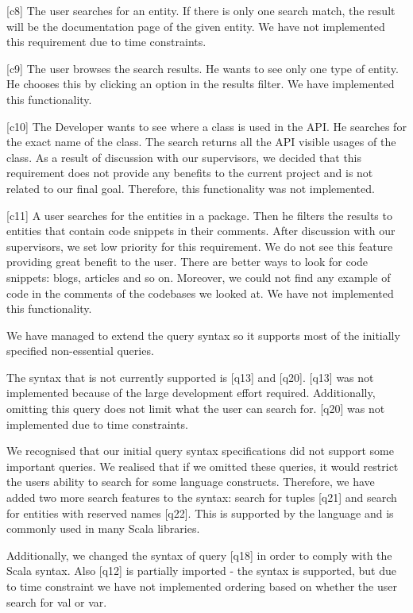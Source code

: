 [c8] The user searches for an entity. If there is only one search match, the result will be the documentation page of the given entity.
We have not implemented this requirement due to time constraints.

[c9] The user browses the search results. He wants to see only one type of entity. He chooses this by clicking an option in the results filter. 
We have implemented this functionality.

[c10] The Developer wants to see where a class is used in the API. He searches for the exact name of the class. The search returns all the API visible usages of the class. As a result of discussion with our supervisors, we decided that this requirement does not provide any benefits to the current project and is not related to our final goal. Therefore, this functionality was not implemented.

[c11] A user searches for the entities in a package. Then he filters the results to entities that contain code snippets in their comments.
After discussion with our supervisors, we set low priority for this requirement. We do not see this feature providing great benefit to the user. There are better ways to look for code snippets: blogs, articles and so on. Moreover,  we could not find any example of code in the comments of the codebases we looked at. We have not implemented this functionality.

We have managed to extend the query syntax so it supports most of the initially specified non-essential queries. 

The syntax that is not currently supported is [q13] and [q20]. [q13] was not implemented because of the large development effort required. Additionally, omitting this query does not limit what the user can search for. [q20] was not implemented due to time constraints. 

We recognised that our initial query syntax specifications did not support some important queries. We realised that if we omitted these queries, it would restrict the users ability to search for some language constructs. Therefore, we have added two more search features to the syntax: search for tuples [q21] and search for entities with reserved names [q22]. This is supported by the language and is commonly used in many Scala libraries. 

Additionally, we changed the syntax of query [q18] in order to comply with the Scala syntax. Also [q12] is partially imported - the syntax is supported, but due to time constraint we have not implemented ordering based on whether the user search for val or var.

